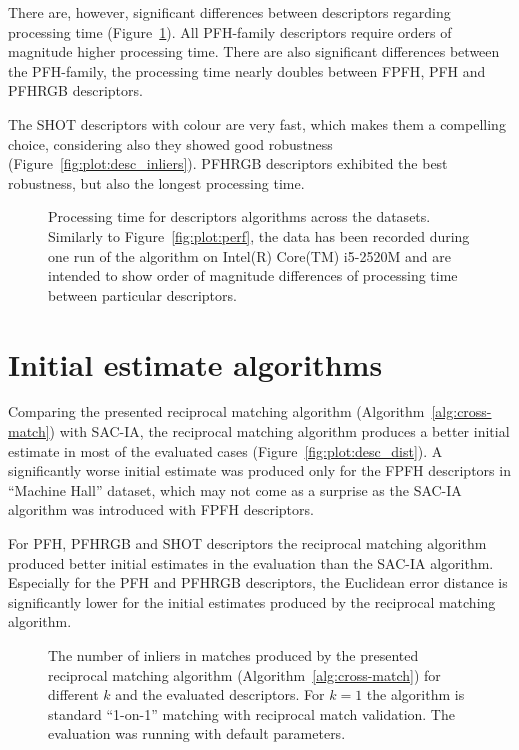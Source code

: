 There are, however, significant differences between descriptors regarding processing time (Figure~\ref{fig:plot:desc_perf}). All \gls{PFH}-family descriptors require orders of magnitude higher processing time. There are also significant differences between the \gls{PFH}-family, the processing time nearly doubles between \gls{FPFH}, \gls{PFH} and \gls{PFHRGB} descriptors.

The \gls{SHOT} descriptors with colour are very fast, which makes them a compelling choice, considering also they showed good robustness (Figure~\ref{fig:plot:desc_inliers}). \gls{PFHRGB} descriptors exhibited the best robustness, but also the longest processing time.

\begin{figure}
  \centering
  
  \caption[Processing time per descriptors]{Processing time for descriptors algorithms across the datasets. Similarly to Figure~\ref{fig:plot:perf}, the data has been recorded during one run of the algorithm on Intel(R) Core(TM) i5-2520M and are intended to show order of magnitude differences of processing time between particular descriptors.}
  \label{fig:plot:desc_perf}
\end{figure}

\section{Initial estimate algorithms}
\label{sec:initial-estimate-algorithms}

Comparing the presented reciprocal matching algorithm (Algorithm~\ref{alg:cross-match}) with \gls{SAC-IA}, the reciprocal matching algorithm produces a better initial estimate in most of the evaluated cases (Figure~\ref{fig:plot:desc_dist}). A significantly worse initial estimate was produced only for the \gls{FPFH} descriptors in ``Machine Hall'' dataset, which may not come as a surprise as the \gls{SAC-IA} algorithm was introduced with \gls{FPFH} descriptors.

For \gls{PFH}, \gls{PFHRGB} and \gls{SHOT} descriptors the reciprocal matching algorithm produced better initial estimates in the evaluation than the \gls{SAC-IA} algorithm. Especially for the \gls{PFH} and \gls{PFHRGB} descriptors, the Euclidean error distance is significantly lower for the initial estimates produced by the reciprocal matching algorithm.

\begin{figure}
  \centering
  
  \caption[The number of inliers per $k$ in the reciprocal matching algorithm]{The number of inliers in matches produced by the presented reciprocal matching algorithm (Algorithm~\ref{alg:cross-match}) for different $k$ and the evaluated descriptors. For $k=1$ the algorithm is standard ``1-on-1'' matching with reciprocal match validation. The evaluation was running with default parameters.}
  \label{fig:plot:matching_k_inliers}
\end{figure}

